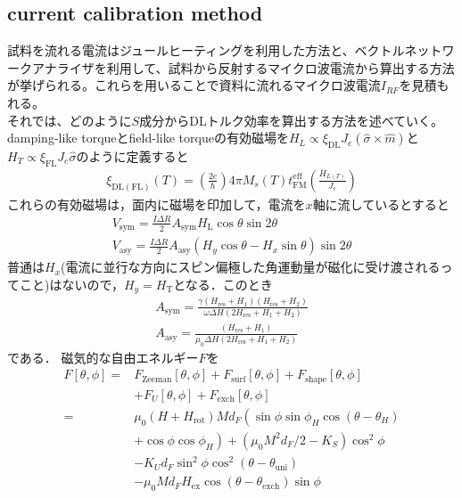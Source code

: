 \documentclass[12pt]{jsbook}
\begin{document}
\subsection{current calibration method}
試料を流れる電流はジュールヒーティングを利用した方法と、ベクトルネットワークアナライザを利用して、試料から反射するマイクロ波電流から算出する方法が挙げられる。これらを用いることで資料に流れるマイクロ波電流$I_{RF}$を見積もれる。\\
それでは、どのように$S$成分からDLトルク効率を算出する方法を述べていく。
damping-like torqueとfield-like torqueの有効磁場を$H_{L} \propto \xi_{\mathrm{DL}} J_{e}(\hat{\sigma} \times \hat{m})$と$H_{T} \propto\xi_{\mathrm{FL}} J_{e} \hat{\sigma}$のように定義すると
\begin{eqnarray}
\xi_{\mathrm{DL}(\mathrm{FL})}(T)=\left(\frac{2 e}{\hbar}\right) 4 \pi M_{s}(T) t_{\mathrm{FM}}^{\mathrm{eff}}\left(\frac{H_{L(T)}}{J_{e}}\right)
\end{eqnarray}
これらの有効磁場は，面内に磁場を印加して，電流を$x$軸に流しているとすると~\cite{PhysRevB.92.214406}
\begin{eqnarray}
V_{\mathrm{sym}}=\frac{I \Delta R}{2} A_{\mathrm{sym}} H_\mathrm{L}\cos\theta \sin 2 \theta \\
V_{\mathrm{asy}}=\frac{I \Delta R}{2} A_{\mathrm{asy}}\left(H_{y} \cos \theta-H_{x} \sin \theta\right) \sin 2 \theta
\end{eqnarray}
普通は$H_x$(電流に並行な方向にスピン偏極した角運動量が磁化に受け渡されるってこと)はないので，$H_y = H_\mathrm{T}$となる．このとき
\begin{eqnarray}
A_{\mathrm{sym}}=\frac{\gamma\left(H_{\mathrm{res}}+H_{1}\right)\left(H_{\mathrm{res}}+H_{2}\right)}{\omega \Delta H\left(2 H_{\mathrm{res}}+H_{1}+H_{2}\right)} \\
A_{\mathrm{asy}}=\frac{\left(H_{\mathrm{res}}+H_{1}\right)}{\mu_{0} \Delta H\left(2 H_{\mathrm{res}}+H_{1}+H_{2}\right)}
\end{eqnarray}
である．
磁気的な自由エネルギー$F$を
\begin{eqnarray}
F[\theta, \phi]=&\nonumber F_{\mathrm{Zeeman}}[\theta, \phi]+F_{\mathrm{surf}}[\theta, \phi]+F_{\mathrm{shape}}[\theta, \phi] \\
&+F_{U}[\theta, \phi]+F_{\mathrm{exch}}[\theta, \phi] \\\nonumber
=& \mu_{0}\left(H+H_{\mathrm{rot}}\right) M d_{F}\left(\sin \phi \sin \phi_{H} \cos \left(\theta-\theta_{H}\right)\right.\\\nonumber
&\left.+\cos \phi \cos \phi_{H}\right)+\left(\mu_{0} M^{2} d_{F} / 2-K_{S}\right) \cos ^{2} \phi \\\nonumber
&-K_{U} d_{F} \sin ^{2} \phi \cos ^{2}\left(\theta-\theta_{\mathrm{uni}}\right) \\
&-\mu_{0} M d_{F} H_{\mathrm{ex}} \cos \left(\theta-\theta_{\mathrm{exch}}\right) \sin \phi
\end{eqnarray}
\end{document}
